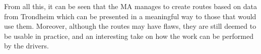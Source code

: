 From all this, it can be seen that the MA manages to create routes based on data from Trondheim which can be presented in a meaningful way to those that would use them. Moreover, although the routes may have flaws, they are still deemed to be usable in practice, and an interesting take on how the work can be performed by the drivers.

\cleardoublepage
